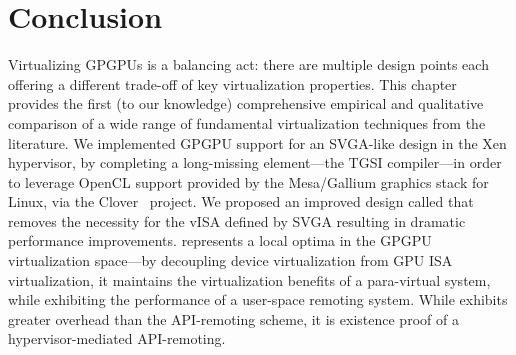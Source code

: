 \section{Conclusion}
\label{sec_con}

Virtualizing GPGPUs is a balancing act: there are multiple design points each offering a different trade-off of key virtualization properties. This chapter provides the first (to our knowledge) comprehensive empirical and qualitative comparison of a wide range of fundamental virtualization techniques from the literature.
We implemented GPGPU support for an SVGA-like design in the Xen hypervisor, by completing a long-missing element---the TGSI compiler---in order to leverage OpenCL support provided by the Mesa/Gallium graphics stack for Linux, via the Clover~\cite{GalliumCompute-web} project.
We proposed an improved design called \Trillium that removes the necessity for the vISA defined by SVGA resulting in dramatic performance improvements.
\Trillium represents a local optima in the GPGPU virtualization space---by decoupling device virtualization from GPU ISA virtualization, it maintains the virtualization benefits of a para-virtual system, while exhibiting the performance of a user-space remoting system. While \Trillium exhibits greater overhead than the API-remoting scheme, it is existence proof of a hypervisor-mediated API-remoting.